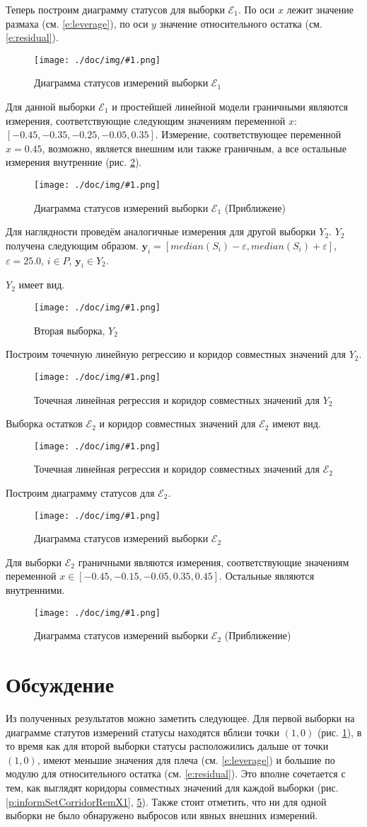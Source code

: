 \documentclass[a4paper,12pt]{article}
\newcommand{\plot}[3]{
    \begin{figure}[H]
        \begin{center}
            \texttt{[image: ./doc/img/\#1.png]}
            \caption{#2}
            \label{#3}
        \end{center}
    \end{figure}
}
\begin{document}
    Теперь построим диаграмму статусов для выборки $ \mathcal{E}_1 $.
    По оси $ x $ лежит значение размаха (см. \ref{e:leverage}), по оси $ y $ значение относительного остатка (см. \ref{e:residual}).
    \plot{DiagramStatusX1}{Диаграмма статусов измерений выборки $ \mathcal{E}_1 $}{p:diagramStatusX1}

    Для данной выборки $ \mathcal{E}_1 $ и простейшей линейной модели граничными являются
    измерения, соответствующие следующим значениям переменной $ x $: $ [-0.45, -0.35, -0.25, -0.05, 0.35] $.
    Измерение, соответствующее переменной $ x = 0.45 $, возможно, является внешним или также граничным,
    а все остальные измерения внутренние (рис. \ref{p:diagramStatusZoomX1}).
    \plot{DiagramStatusZoomX1}{Диаграмма статусов измерений выборки $ \mathcal{E}_1 $ (Приближеие)}{p:diagramStatusZoomX1}

    Для наглядности проведём аналогичные измерения для другой выборки $ Y_2 $.
    $ Y_2 $ получена следующим образом. $ \textbf{y}_i = [median(S_i) - \varepsilon, median(S_i) + \varepsilon] $,
    $ \varepsilon = 25.0 $, $ i \in P $, $ \textbf{y}_i \in Y_2 $. 

    $ Y_2 $ имеет вид.
    \plot{SampleX2}{Вторая выборка, $ Y_2 $}{p:sampleX2}

    Построим точечную линейную регрессию и коридор совместных значений для $ Y_2 $.
    \plot{InformSetCorridorX2}{Точечная линейная регрессия и коридор совместных значений для $ Y_2 $}{p:informSetCorridorX2}

    Выборка остатков $ \mathcal{E}_2 $ и коридор совместных значений для $ \mathcal{E}_2 $ имеют вид.
    \plot{InformSetCorridorRemX2}{Точечная линейная регрессия и коридор совместных значений для $ \mathcal{E}_2 $}{p:informSetCorridorRemX2}

    Построим диаграмму статусов для $ \mathcal{E}_2 $.
    \plot{DiagramStatusX2}{Диаграмма статусов измерений выборки $ \mathcal{E}_2 $}{p:diagramStatusX2}

    Для выборки $ \mathcal{E}_2 $ граничными являются измерения, соответствующие значениям
    переменной $ x \in [-0.45, -0.15, -0.05, 0.35, 0.45] $.
    Остальные являются внутренними.
    \plot{DiagramStatusZoomX2}{Диаграмма статусов измерений выборки $ \mathcal{E}_2 $ (Приближение)}{p:diagramStatusZoomX2}

    \section{Обсуждение}
    \quad Из полученных результатов можно заметить следующее.
    Для первой выборки на диаграмме статутов измерений статусы находятся вблизи точки $ (1, 0) $ (рис. \ref{p:diagramStatusX1}),
    в то время как для второй выборки статусы расположились дальше от точки $ (1, 0) $,
    имеют меньшие значения для плеча (см. \ref{e:leverage}) и большие по модулю для относительного остатка (см. \ref{e:residual}).
    Это вполне сочетается с тем, как выглядят коридоры совместных значений для каждой выборки
    (рис. \ref{p:informSetCorridorRemX1}, \ref{p:informSetCorridorRemX2}).
    Также стоит отметить, что ни для одной выборки не было обнаружено выбросов или явных внешних измерений.
\end{document}
